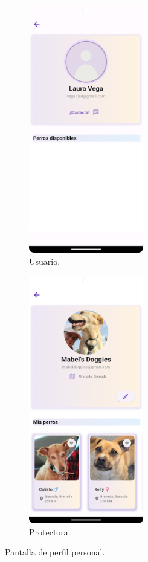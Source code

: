 \documentclass[a4paper, 12pt]{article}
\begin{document}
\begin{figure}[H]
   	\begin{subfigure}{0.48\textwidth}
		\begin{center}
			{\includegraphics[width=5cm]{app/UserProfile.png}\par}
			\caption{Usuario.}
		\end{center}  
	\end{subfigure}\hfill
   	\begin{subfigure}{0.48\textwidth}
		\begin{center}
			{\includegraphics[width=5cm]{app/CompanyProfile.png}\par}
			\caption{Protectora.}
		\end{center}  
	\end{subfigure}\hfill
	\caption{Pantalla de perfil personal.}
\end{figure}
\end{document}
